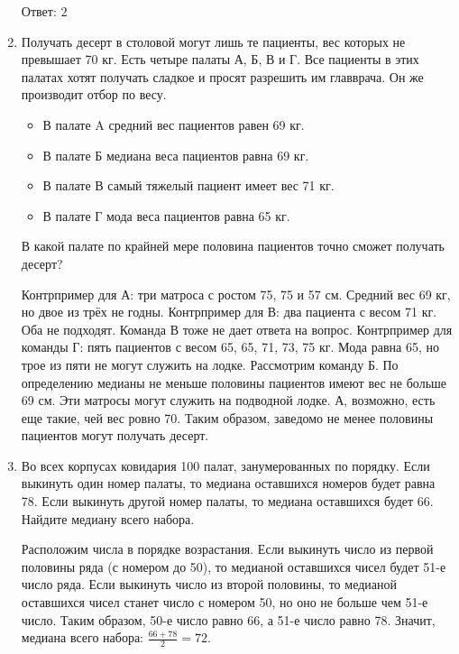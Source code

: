 \documentclass[12pt]{article}
\newenvironment{solution}{}{}
\begin{document}
\begin{enumerate}
\begin{solution}
    Ответ: $2$
\end{solution}
   
    \item Получать десерт в столовой могут лишь те пациенты, вес которых не превышает 70 кг. Есть четыре палаты А, Б, В и Г. Все пациенты в этих палатах хотят получать сладкое и просят разрешить им главврача. Он же производит отбор по весу.
    \begin{itemize}
        \item В палате A средний вес пациентов равен 69 кг.
        \item В палате Б медиана веса пациентов равна 69 кг.
        \item В палате В самый тяжелый пациент имеет вес 71 кг.
        \item В палате Г мода веса пациентов равна 65 кг.
    \end{itemize}
В какой палате по крайней мере половина пациентов точно сможет получать десерт?

\begin{solution}
Контрпример для  А: три матроса с ростом  75, 75 и 57 см. Средний вес 69 кг, но двое из трёх не годны. 
Контрпример для В: два пациента с весом 71 кг. Оба не подходят. Команда В тоже не дает ответа на вопрос.
Контрпример для команды Г: пять пациентов с весом 65, 65, 71, 73, 75 кг. Мода равна 65, но трое из пяти не могут служить на лодке.
Рассмотрим команду Б. По определению медианы не меньше половины пациентов имеют вес не больше 69 см. Эти матросы могут служить на подводной лодке. А, возможно, есть еще такие, чей вес ровно 70. Таким образом, заведомо не менее половины пациентов могут получать десерт.
\end{solution}

    \item Во всех корпусах ковидария 100 палат, занумерованных по порядку. Если выкинуть один номер палаты, то медиана оставшихся номеров будет равна 78. Если выкинуть другой номер палаты, то медиана оставшихся будет 66. Найдите медиану всего набора.

\begin{solution}
Расположим числа в порядке возрастания. Если выкинуть число из первой половины ряда (с номером до 50), то медианой оставшихся чисел будет 51-е число ряда. Если выкинуть число из второй половины, то медианой оставшихся чисел станет число с номером 50, но оно не больше чем 51-е число. Таким образом, 50-е число равно 66, а 51-е число равно 78. Значит, медиана всего набора: $\frac{66 + 78}{2}=72$.
\end{solution}


\end{enumerate}
\end{document}
